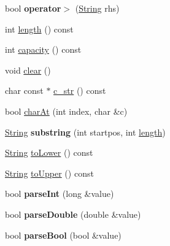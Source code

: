 \begin{DoxyCompactItemize}
\item 
bool {\bfseries operator$>$} (\hyperlink{classisat__utils_1_1_string}{String} rhs)\hypertarget{classisat__utils_1_1_string_a7c30434daf5b2c1210f68d4058249d1e}{}\label{classisat__utils_1_1_string_a7c30434daf5b2c1210f68d4058249d1e}

\item 
int \hyperlink{classisat__utils_1_1_string_aebbe51bc0a66580e6fae5a8df6e8197d}{length} () const 
\item 
int \hyperlink{classisat__utils_1_1_string_ace3e7442c0f491e40a3d2591a9f23032}{capacity} () const 
\item 
void \hyperlink{classisat__utils_1_1_string_a63c3cd6bb9e714631bd8c6220a114f21}{clear} ()
\item 
char const $\ast$ \hyperlink{classisat__utils_1_1_string_adb9a310b21d6ae57c5a4402343f55af1}{c\+\_\+str} () const 
\item 
bool \hyperlink{classisat__utils_1_1_string_a8a62556f24cc9bee02190b36166fccae}{char\+At} (int index, char \&c)
\item 
\hyperlink{classisat__utils_1_1_string}{String} {\bfseries substring} (int startpos, int \hyperlink{classisat__utils_1_1_string_aebbe51bc0a66580e6fae5a8df6e8197d}{length})\hypertarget{classisat__utils_1_1_string_af0323aab236cf048cfbd141adaab2606}{}\label{classisat__utils_1_1_string_af0323aab236cf048cfbd141adaab2606}

\item 
\hyperlink{classisat__utils_1_1_string}{String} \hyperlink{classisat__utils_1_1_string_a895148a2d7201b1e45ed863ada35ed0d}{to\+Lower} () const 
\item 
\hyperlink{classisat__utils_1_1_string}{String} \hyperlink{classisat__utils_1_1_string_a3995ede4119f8b094cdb4ffdf73d7e59}{to\+Upper} () const 
\item 
bool {\bfseries parse\+Int} (long \&value)\hypertarget{classisat__utils_1_1_string_a28f610edff258863dc1a5a2c396aab4d}{}\label{classisat__utils_1_1_string_a28f610edff258863dc1a5a2c396aab4d}

\item 
bool {\bfseries parse\+Double} (double \&value)\hypertarget{classisat__utils_1_1_string_a402816d16b35457fdbee9c6ac3390e6b}{}\label{classisat__utils_1_1_string_a402816d16b35457fdbee9c6ac3390e6b}

\item 
bool {\bfseries parse\+Bool} (bool \&value)\hypertarget{classisat__utils_1_1_string_a3dae7076e632c06f368ebf135bf7face}{}\label{classisat__utils_1_1_string_a3dae7076e632c06f368ebf135bf7face}


\end{DoxyCompactItemize}
